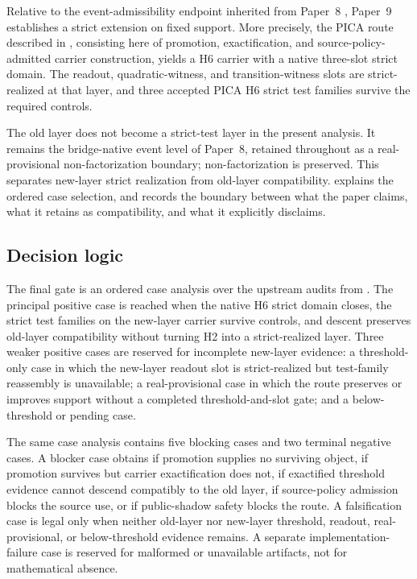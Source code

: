 \documentclass[11pt]{article}
\newcommand{\OldLayer}{H2}
\newcommand{\NewLayer}{H6}
\newcommand{\PaperNine}{Paper~9}
\newcommand{\PaperEight}{Paper~8}
\newcommand{\AcceptedTestCount}{three}
\newcommand{\OldLayerStatus}{real-provisional non-factorization boundary}
\theoremstyle{definition}
\begin{document}
Relative to the event-admissibility endpoint inherited from \PaperEight{}
\cite{Tsiokos2026CarrierToEvent}, \PaperNine{} establishes a strict extension
on fixed support.  More precisely, the PICA route described in
, consisting here of promotion, exactification, and
source-policy-admitted carrier construction, yields a \NewLayer{} carrier with a
native three-slot strict domain.  The readout, quadratic-witness, and
transition-witness slots are strict-realized at that layer, and
\AcceptedTestCount{} accepted PICA \NewLayer{} strict test families survive the
required controls.

The old layer does not become a strict-test layer in the present analysis.  It
remains the bridge-native event level of \PaperEight{}, retained throughout as a
\OldLayerStatus{}; non-factorization is preserved.  This separates new-layer
strict realization from old-layer compatibility.  
explains the ordered case selection, and 
records the boundary between what the paper claims, what it retains as
compatibility, and what it explicitly disclaims.

\subsection{Decision logic}\label{subsec:decision-logic}

The final gate is an ordered case analysis over the upstream audits from
.  The principal
positive case is reached when the native \NewLayer{} strict domain closes, the
strict test families on the new-layer carrier survive controls, and descent
preserves old-layer compatibility without turning \OldLayer{} into a
strict-realized layer.  Three weaker positive cases are reserved for incomplete
new-layer evidence: a threshold-only case in which the new-layer readout slot is
strict-realized but test-family reassembly is unavailable; a real-provisional
case in which the route preserves or improves support without a completed
threshold-and-slot gate; and a below-threshold or pending case.

The same case analysis contains five blocking cases and two terminal negative
cases.  A blocker case obtains if promotion supplies no surviving object, if
promotion survives but carrier exactification does not, if exactified threshold
evidence cannot descend compatibly to the old layer, if source-policy admission
blocks the source use, or if public-shadow safety blocks the route.  A
falsification case is legal only when neither old-layer nor new-layer threshold,
readout, real-provisional, or below-threshold evidence remains.  A separate
implementation-failure case is reserved for malformed or unavailable artifacts,
not for mathematical absence.
\end{document}
